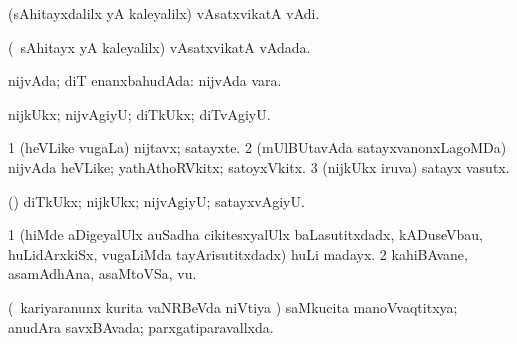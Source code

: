 {{\bentry
{} 
\gl{\nA}
\expl{}
\bmng
 (sAhitayxdalilx yA kaleyalilx) vAsatxvikatA vAdi. 
\emng
\eentry

\bentry
{} 
\gl{\gu}
\expl{}
\bmng
 (\sA\ sAhitayx yA kaleyalilx) vAsatxvikatA vAdada. 
\emng
\eentry

\bentry
{} 
\gl{\gu}
\expl{}
\bmng
 nijvAda; diT enanxbahudAda:  nijvAda vara. 
\emng
\eentry

\bentry
{} 
\gl{\kirxvi}
\expl{}
\bmng
 nijkUkx; nijvAgiyU; diTkUkx; diTvAgiyU. 
\emng
\eentry

\bentry
{} 
\gl{\nA}
\bmng
\bnum
\num{1} (heVLike \mo vugaLa) nijtavx; satayxte. 
\num{2} (mUlBUtavAda satayxvanonxLagoMDa) nijvAda heVLike; yathAthoRVkitx; satoyxVkitx. 
\num{3} (nijkUkx iruva) satayx vasutx. 
\enum
\emng

\noindent 
\gl{\pagu}
\expl{}
\bmng
{} (\pArxparx) diTkUkx; nijkUkx; nijvAgiyU; satayxvAgiyU. 
\emng
\eentry

\bentry
{} 
\gl{\nA}
\expl{}
\bmng
\bnum
\num{1} (hiMde aDigeyalUlx auSadha cikitesxyalUlx baLasutitxdadx, kADuseVbau, huLidArxkiSx, \mo vugaLiMda tayArisutitxdadx) huLi madayx. 
\num{2} kahiBAvane, asamAdhAna, asaMtoVSa, \mo vu. 
\enum
\emng
\eentry

\bentry 
{} 
\gl{\gu}
\expl{\SAfr\ }
\bmng
(\kanmu\ kariyaranunx kurita vaNRBeVda niVtiya \vi) saMkucita manoVvaqtitxya; anudAra savxBAvada; parxgatiparavallxda. 
\emng
\eentry

\bentry 
{} 
\gl{\nA}
}}
